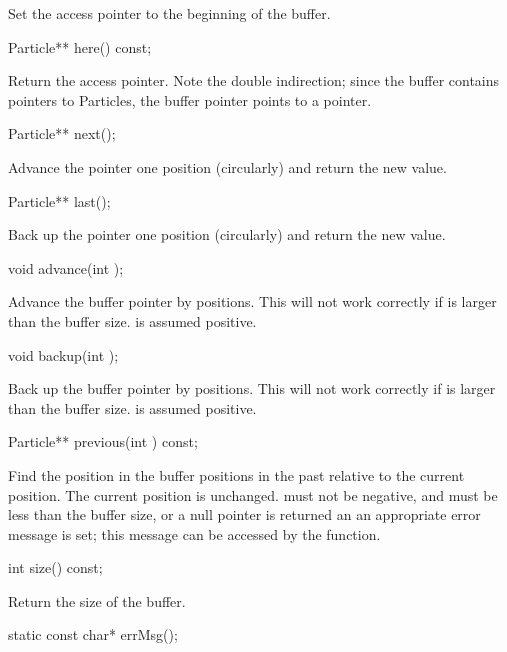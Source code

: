 Set the access pointer to the beginning of the buffer.

\begin{example}
Particle** here() const;
\end{example}

Return the access pointer.  Note the double indirection; since the
buffer contains pointers to Particles, the buffer pointer points
to a pointer.

\begin{example}
Particle** next();
\end{example}

Advance the pointer one position (circularly) and return the new value.

\begin{example}
Particle** last();
\end{example}

Back up the pointer one position (circularly) and return the new value.

\begin{example}
void advance(int );
\end{example}

Advance the buffer pointer by  positions.  This will not work correctly
if  is larger than the buffer size.   is assumed positive.

\begin{example}
void backup(int );
\end{example}

Back up the buffer pointer by  positions.  This will not work correctly
if  is larger than the buffer size.   is assumed positive.

\begin{example}
Particle** previous(int ) const;
\end{example}

Find the position in the buffer  positions in the past
relative to the current position.  The current position is unchanged.
 must not be negative, and must be less than the buffer
size, or a null pointer is returned an an appropriate error message
is set; this message can be accessed by the  function.

\begin{example}
int size() const;
\end{example}

Return the size of the buffer.

\begin{example}
static const char* errMsg();
\end{example}

